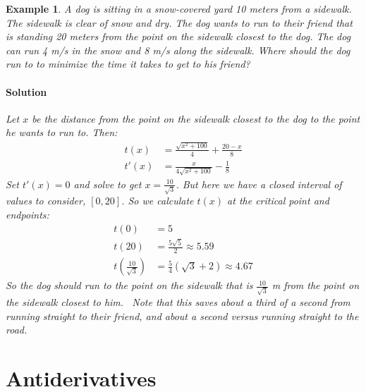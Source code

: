 \documentclass[letterpaper, 11pt, openany]{book}
\theoremstyle{mytheoremstyle}
\theoremstyle{myexamplestyle}
\newtheorem{example}{Example}[section]
\newenvironment{solution}{\paragraph{\sffamily \smaller \fontseries{b}\selectfont Solution}}{\hfill\faSquare}
\begin{document}
\begin{example}\label{e:optimize-dog-snow}
    A dog is sitting in a snow-covered yard 10 meters from a sidewalk. The sidewalk is clear of snow and dry. The dog wants to run to their friend that is standing 20 meters from the point on the sidewalk closest to the dog. The dog can run 4 m/s in the snow and 8 m/s along the sidewalk. Where should the dog run to to minimize the time it takes to get to his friend?
    \begin{solution}
        Let \(x\) be the distance from the point on the sidewalk closest to the dog to the point he wants to run to. Then:
        \begin{align*}
            t(x) &= \frac{\sqrt{x^{2} + 100}}{4} + \frac{20-x}{8}\\
            t'(x) &= \frac{x}{4 \sqrt{x^2+100}}-\frac{1}{8}
        \end{align*}
        Set \(t'(x) = 0\) and solve to get \(x = \frac{10}{\sqrt{3}}\). But here we have a closed interval of values to consider, \([0, 20]\). So we calculate \(t(x)\) at the critical point and endpoints:
        \begin{align*}
            t(0) &= 5\\
            t(20) &= \frac{5\sqrt{5}}{2} \approx 5.59\\
            t\left(\frac{10}{\sqrt{3}}\right) &= \frac{5}{4} \left(\sqrt{3}+2\right) \approx 4.67
        \end{align*}
    So the dog should run to the point on the sidewalk that is \(\frac{10}{\sqrt{3}}\) m from the point on the sidewalk closest to him. \faSmile \ Note that this saves about a third of a second from running straight to their friend, and about a second versus running straight to the road. \faMeh
    \end{solution}
\end{example}


\section{Antiderivatives}
\end{document}
